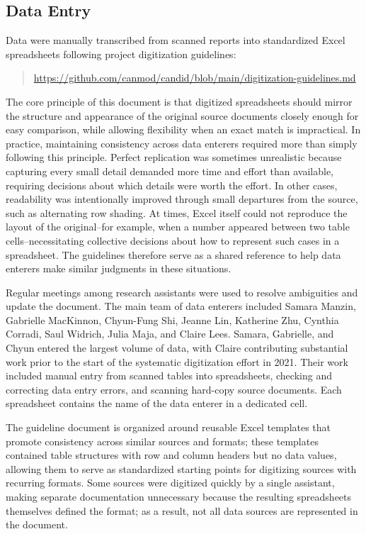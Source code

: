 \documentclass[12pt]{article}
\begin{document}
\subsection{Data Entry}\label{sec:appendix-data-entry}

Data were manually transcribed from scanned reports into standardized Excel spreadsheets following project digitization guidelines:

\begin{quote}
\url{https://github.com/canmod/candid/blob/main/digitization-guidelines.md}
\end{quote}

The core principle of this document is that digitized spreadsheets should mirror the structure and appearance of the original source documents closely enough for easy comparison, while allowing flexibility when an exact match is impractical. In practice, maintaining consistency across data enterers required more than simply following this principle. Perfect replication was sometimes unrealistic because capturing every small detail demanded more time and effort than available, requiring decisions about which details were worth the effort. In other cases, readability was intentionally improved through small departures from the source, such as alternating row shading. At times, Excel itself could not reproduce the layout of the original--for example, when a number appeared between two table cells--necessitating collective decisions about how to represent such cases in a spreadsheet. The guidelines therefore serve as a shared reference to help data enterers make similar judgments in these situations.

Regular meetings among research assistants were used to resolve ambiguities and update the document. The main team of data enterers included Samara Manzin, Gabrielle MacKinnon, Chyun-Fung Shi, Jeanne Lin, Katherine Zhu, Cynthia Corradi, Saul Widrich, Julia Maja, and Claire Lees. Samara, Gabrielle, and Chyun entered the largest volume of data, with Claire contributing substantial work prior to the start of the systematic digitization effort in 2021. Their work included manual entry from scanned tables into spreadsheets, checking and correcting data entry errors, and scanning hard-copy source documents. Each spreadsheet contains the name of the data enterer in a dedicated cell.

The guideline document is organized around reusable Excel templates that promote consistency across similar sources and formats; these templates contained table structures with row and column headers but no data values, allowing them to serve as standardized starting points for digitizing sources with recurring formats. Some sources were digitized quickly by a single assistant, making separate documentation unnecessary because the resulting spreadsheets themselves defined the format; as a result, not all data sources are represented in the document.
\end{document}

